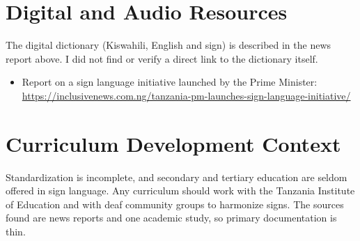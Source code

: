 \documentclass[12pt]{article}
\begin{document}
\section{Digital and Audio Resources}
The digital dictionary (Kiswahili, English and sign) is described in the news report above. I did not find or verify a direct link to the dictionary itself.
\begin{itemize}
\item Report on a sign language initiative launched by the Prime Minister: \url{https://inclusivenews.com.ng/tanzania-pm-launches-sign-language-initiative/}
\end{itemize}

\section{Curriculum Development Context}
Standardization is incomplete, and secondary and tertiary education are seldom offered in sign language. Any curriculum should work with the Tanzania Institute of Education and with deaf community groups to harmonize signs. The sources found are news reports and one academic study, so primary documentation is thin.
\end{document}
